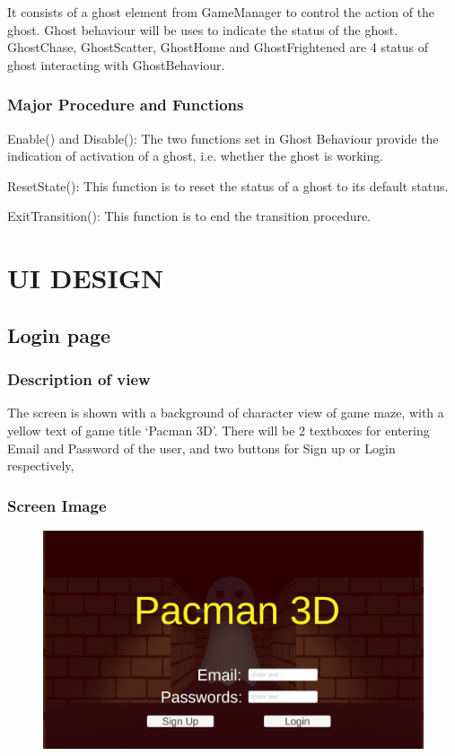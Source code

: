 \documentclass[11pt]{article}
\begin{document}
It consists of a ghost element from GameManager to control the action of the ghost. Ghost behaviour will be uses to indicate the status of the ghost. GhostChase, GhostScatter, GhostHome and GhostFrightened are 4 status of ghost interacting with GhostBehaviour.
\subsubsection{Major Procedure and Functions}
Enable() and Disable(): The two functions set in Ghost Behaviour provide the indication of activation of a ghost, i.e. whether the ghost is working.

ResetState(): This function is to reset the status of a ghost to its default status.

ExitTransition(): This function is to end the transition procedure.

\section{UI DESIGN}

\subsection{Login page}
\subsubsection{Description of view}
The screen is shown with a background of character view of game maze, with a yellow text of game title `Pacman 3D'. There will be 2 textboxes for entering Email and Password of the user, and two buttons for Sign up or Login respectively,
\subsubsection{Screen Image}
\begin{figure}[H]
    \centering
    \includegraphics*[scale=0.2]{UI0.0Login.png}
\end{figure}
\end{document}

